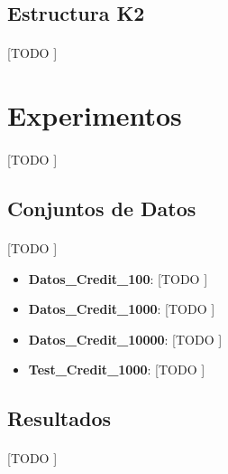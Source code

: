 \documentclass{article}
\begin{document}
		\subsection{Estructura K2}
		\label{sec:structure_K2}

			\paragraph{}
			[TODO ]



	\section{Experimentos}
	\label{sec:experiments}

		\paragraph{}
		[TODO ]

		\subsection{Conjuntos de Datos}

			\paragraph{}
			[TODO ]

			\begin{itemize}
				\item \textbf{Datos\_Credit\_100}: [TODO ]
				\item \textbf{Datos\_Credit\_1000}: [TODO ]
				\item \textbf{Datos\_Credit\_10000}: [TODO ]
				\item \textbf{Test\_Credit\_1000}: [TODO ]
			\end{itemize}


		\subsection{Resultados}


			\paragraph{}
			[TODO ]
\end{document}
